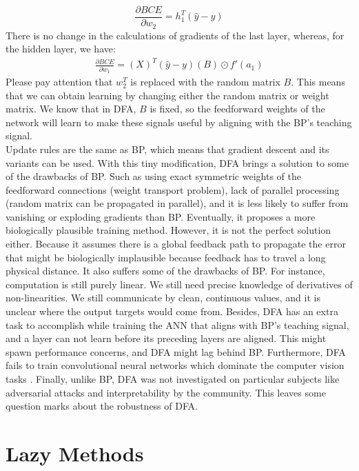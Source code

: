 \documentclass[a4paper, nobind]{templates/ociamthesis}
\begin{document}
\[
\frac{\partial BCE}{\partial w_{2}}=h_{1}^T\left(\hat{y}-y\right)
\]
There is no change in the calculations of gradients of the last layer, whereas, for the hidden layer, we have:
\[
\begin{aligned}
\frac{\partial BCE}{\partial w_{1}}= \left(X\right)^T\left(\hat{y}-y\right)\left(B\right) \odot f'(a_1)
\end{aligned}
\]
Please pay attention that \(w_2^T\) is replaced with the random matrix \(B\). This means that we can obtain learning by changing either the random matrix or weight matrix. We know that in DFA, \(B\) is fixed, so the feedforward weights of the network will learn to make these signals useful by aligning with the BP's teaching signal.\\
Update rules are the same as BP, which means that gradient descent and its variants can be used. With this tiny modification, DFA brings a solution to some of the drawbacks of BP. Such as using exact symmetric weights of the feedforward connections (weight transport problem), lack of parallel processing (random matrix can be propagated in parallel), and it is less likely to suffer from vanishing or exploding gradients than BP. Eventually, it proposes a more biologically plausible training method. However, it is not the perfect solution either. Because it assumes there is a global feedback path to propagate the error that might be biologically implausible because feedback has to travel a long physical distance. It also suffers some of the drawbacks of BP. For instance, computation is still purely linear. We still need precise knowledge of derivatives of non-linearities. We still communicate by clean, continuous values, and it is unclear where the output targets would come from. Besides, DFA has an extra task to accomplish while training the ANN that aligns with BP's teaching signal, and a layer can not learn before its preceding layers are aligned. This might spawn performance concerns, and DFA might lag behind BP.
Furthermore, DFA fails to train convolutional neural networks which dominate the computer vision tasks \cite{refinetti2021align, launay2019principled}. Finally, unlike BP, DFA was not investigated on particular subjects like adversarial attacks and interpretability by the community. This leaves some question marks about the robustness of DFA.

\hypertarget{lazy-methods}{%
\section{Lazy Methods}\label{lazy-methods}}
\end{document}
